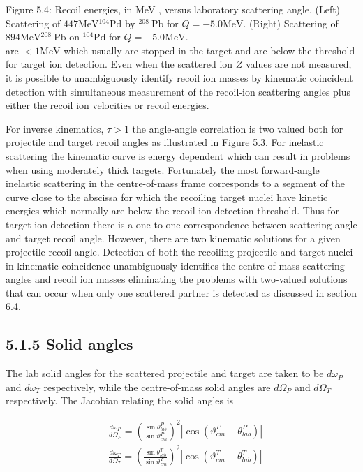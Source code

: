 \documentclass[10pt]{article}
\begin{document}
Figure 5.4: Recoil energies, in MeV , versus laboratory scattering angle. (Left) Scattering of $447 \mathrm{MeV}{ }^{104} \mathrm{Pd}$ by ${ }^{208} \mathrm{~Pb}$ for $Q=-5.0 \mathrm{MeV}$. (Right) Scattering of $894 \mathrm{MeV}{ }^{208} \mathrm{~Pb}$ on ${ }^{104} \mathrm{Pd}$ for $Q=-5.0 \mathrm{MeV}$.\\
are $<1 \mathrm{MeV}$ which usually are stopped in the target and are below the threshold for target ion detection. Even when the scattered ion $Z$ values are not measured, it is possible to unambiguously identify recoil ion masses by kinematic coincident detection with simultaneous measurement of the recoil-ion scattering angles plus either the recoil ion velocities or recoil energies.

For inverse kinematics, $\tau>1$ the angle-angle correlation is two valued both for projectile and target recoil angles as illustrated in Figure 5.3. For inelastic scattering the kinematic curve is energy dependent which can result in problems when using moderately thick targets. Fortunately the most forward-angle inelastic scattering in the centre-of-mass frame corresponds to a segment of the curve close to the abscissa for which the recoiling target nuclei have kinetic energies which normally are below the recoil-ion detection threshold. Thus for target-ion detection there is a one-to-one correspondence between scattering angle and target recoil angle. However, there are two kinematic solutions for a given projectile recoil angle. Detection of both the recoiling projectile and target nuclei in kinematic coincidence unambiguously identifies the centre-of-mass scattering angles and recoil ion masses eliminating the problems with two-valued solutions that can occur when only one scattered partner is detected as discussed in section 6.4.

\subsection*{5.1.5 Solid angles}
The lab solid angles for the scattered projectile and target are taken to be $d \omega_{P}$ and $d \omega_{T}$ respectively, while the centre-of-mass solid angles are $d \Omega_{P}$ and $d \Omega_{T}$ respectively. The Jacobian relating the solid angles is


\begin{align*}
& \frac{d \omega_{P}}{d \Omega_{P}}=\left(\frac{\sin \theta_{l a b}^{P}}{\sin \vartheta_{c m}^{P}}\right)^{2}\left|\cos \left(\vartheta_{c m}^{P}-\theta_{l a b}^{P}\right)\right|  \tag{5.18}\\
& \frac{d \omega_{T}}{d \Omega_{T}}=\left(\frac{\sin \theta_{l a b}^{T}}{\sin \vartheta_{c m}^{T}}\right)^{2}\left|\cos \left(\vartheta_{c m}^{T}-\theta_{l a b}^{T}\right)\right| \tag{5.19}
\end{align*}
\end{document}
